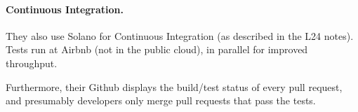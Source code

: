 \documentclass[11pt]{article}
\begin{document}
\paragraph{Continuous Integration.} They also use Solano for Continuous
Integration (as described in the L24 notes). Tests run at Airbnb (not
in the public cloud), in parallel for improved throughput.

Furthermore, their Github displays the build/test status of every pull
request, and presumably developers only merge pull requests that pass
the tests.
\end{document}
